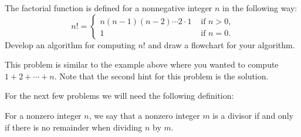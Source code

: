 \documentclass{ximera}
\begin{document}
\begin{question}
	The factorial function is defined for a nonnegative integer $n$ in the following way:
	$$n! = \begin{cases}n(n-1)(n-2)\cdots 2\cdot 1 & \text{ if $n>0$,}\\
		1 & \text{ if $n=0$.}
	\end{cases}$$
	Develop an algorithm for computing $n!$ and draw a flowchart for your algorithm.
	\begin{hint}
		This problem is similar to the example above where you wanted to compute $1+2+\cdots+n$. Note that the second hint for this problem is the solution.
	\end{hint}
	\begin{hint}
		\begin{center}
		\end{center}
	\end{hint}
\end{question}

For the next few problems we will need the following definition:

\begin{definition}
	For a nonzero integer $n$, we say that a nonzero integer $m$ is a divisor if and only if there is no remainder when dividing $n$ by $m$.
\end{definition}
\end{document}
